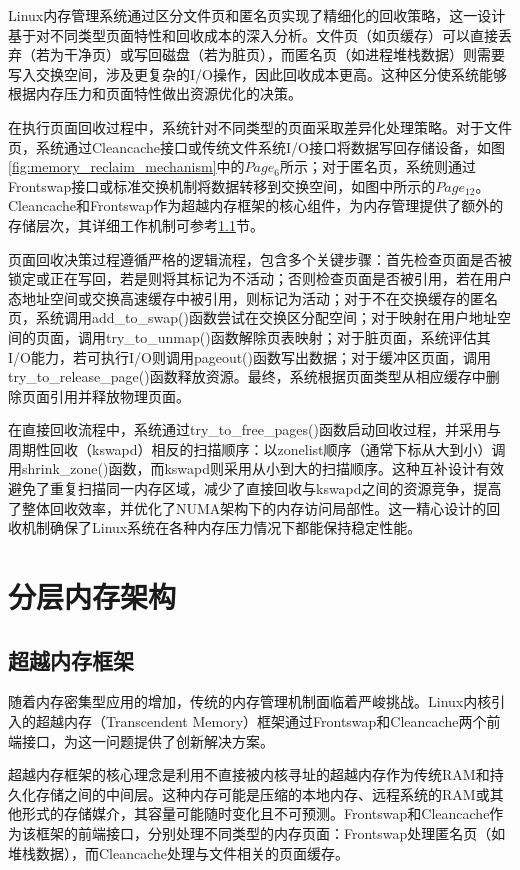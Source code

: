 Linux内存管理系统通过区分文件页和匿名页实现了精细化的回收策略，这一设计基于对不同类型页面特性和回收成本的深入分析。文件页（如页缓存）可以直接丢弃（若为干净页）或写回磁盘（若为脏页），而匿名页（如进程堆栈数据）则需要写入交换空间，涉及更复杂的I/O操作，因此回收成本更高。这种区分使系统能够根据内存压力和页面特性做出资源优化的决策。

在执行页面回收过程中，系统针对不同类型的页面采取差异化处理策略。对于文件页，系统通过Cleancache接口或传统文件系统I/O接口将数据写回存储设备，如图\ref{fig:memory_reclaim_mechanism}中的$Page_{6}$所示；对于匿名页，系统则通过Frontswap接口或标准交换机制将数据转移到交换空间，如图中所示的$Page_{12}$。Cleancache和Frontswap作为超越内存框架的核心组件，为内存管理提供了额外的存储层次，其详细工作机制可参考\ref{sec:超越内存框架}节。

页面回收决策过程遵循严格的逻辑流程，包含多个关键步骤：首先检查页面是否被锁定或正在写回，若是则将其标记为不活动；否则检查页面是否被引用，若在用户态地址空间或交换高速缓存中被引用，则标记为活动；对于不在交换缓存的匿名页，系统调用add\_to\_swap()函数尝试在交换区分配空间；对于映射在用户地址空间的页面，调用try\_to\_unmap()函数解除页表映射；对于脏页面，系统评估其I/O能力，若可执行I/O则调用pageout()函数写出数据；对于缓冲区页面，调用try\_to\_release\_page()函数释放资源。最终，系统根据页面类型从相应缓存中删除页面引用并释放物理页面。

在直接回收流程中，系统通过try\_to\_free\_pages()函数启动回收过程，并采用与周期性回收（kswapd）相反的扫描顺序：以zonelist顺序（通常下标从大到小）调用shrink\_zone()函数，而kswapd则采用从小到大的扫描顺序。这种互补设计有效避免了重复扫描同一内存区域，减少了直接回收与kswapd之间的资源竞争，提高了整体回收效率，并优化了NUMA架构下的内存访问局部性。这一精心设计的回收机制确保了Linux系统在各种内存压力情况下都能保持稳定性能。

\section{分层内存架构}

\subsection{超越内存框架}
\label{sec:超越内存框架}
随着内存密集型应用的增加，传统的内存管理机制面临着严峻挑战。Linux内核引入的超越内存（Transcendent Memory）框架通过Frontswap和Cleancache两个前端接口，为这一问题提供了创新解决方案。

超越内存框架的核心理念是利用不直接被内核寻址的超越内存作为传统RAM和持久化存储之间的中间层。这种内存可能是压缩的本地内存、远程系统的RAM或其他形式的存储媒介，其容量可能随时变化且不可预测。Frontswap和Cleancache作为该框架的前端接口，分别处理不同类型的内存页面：Frontswap处理匿名页（如堆栈数据），而Cleancache处理与文件相关的页面缓存。

